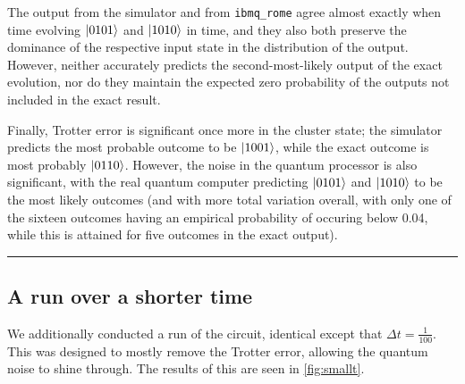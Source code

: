 \documentclass[10pt]{amsart}
\theoremstyle{definition}
\newcommand\separator{\vspace{1em}\hrule \vspace{1em}}
\begin{document}
The output from the simulator and from \texttt{ibmq\_rome} agree almost exactly
when time evolving $\ket{0101}$ and $\ket{1010}$ in time, and they also both
preserve the dominance of the respective input state in the distribution of the
output. However, neither accurately predicts the second-most-likely output of
the exact evolution, nor do they maintain the expected zero probability of
the outputs not included in the exact result.

Finally, Trotter error is significant once more in the cluster state; the
simulator predicts the most probable outcome to be $\ket{1001}$, while the exact
outcome is most probably $\ket{0110}$. However, the noise in the quantum
processor is also significant, with the real quantum computer predicting
$\ket{0101}$ and $\ket{1010}$ to be the most likely outcomes (and with more
total variation overall, with only one of the sixteen outcomes having an
empirical probability of occuring below 0.04, while this is attained for five
outcomes in the exact output).

\separator


\subsection{A run over a shorter time} \label{subsec:smallt}

We additionally conducted a run of the circuit, identical except that
$\Delta t = \frac{1}{100}$. This was designed to mostly remove the Trotter
error, allowing the quantum noise to shine through. The results of this are seen
in \cref{fig:smallt}.
\end{document}
